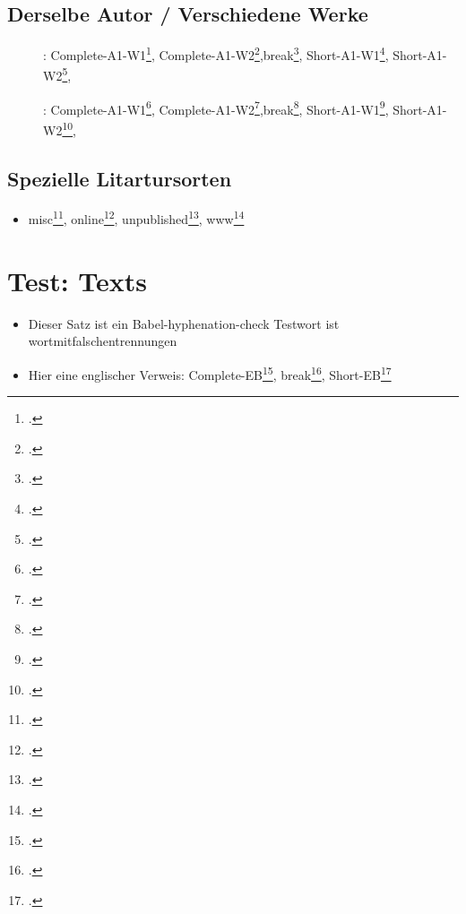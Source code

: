 \documentclass[
  DIV=calc,
  BCOR=5mm,
  11pt,
  headings=small,
  oneside,
  abstract=true,
  toc=bib,
  english,ngerman]{scrartcl}
\begin{document}
\subsection{Derselbe Autor / Verschiedene Werke}
\begin{description}
  \item[\mars]: Complete-A1-W1\footcite[vgl.][15]{S12020a}, Complete-A1-W2\footcite[vgl.][15]{S22020a},break\footcite[vgl.][15]{BR2020a}, Short-A1-W1\footcite[vgl.][15]{S12020a}, Short-A1-W2\footcite[vgl.][15]{S22020a},
  \item[\female\female]: Complete-A1-W1\footcite[vgl.][15]{S32020a}, Complete-A1-W2\footcite[vgl.][15]{S42020a},break\footcite[vgl.][15]{BR2020a}, Short-A1-W1\footcite[vgl.][15]{S32020a}, Short-A1-W2\footcite[vgl.][15]{S42020a},
\end{description}

\subsection{Spezielle Litartursorten}
\begin{itemize}
  \item misc\footcite[vgl.][15]{M12020a}, online\footcite[vgl.][15]{O12020a}, unpublished\footcite[vgl.][15]{UP12020a}, www\footcite[vgl.][15]{W12020a}
\end{itemize}


\section{Test: Texts}

\begin{itemize}
  \item Dieser Satz ist ein Babel-hyphenation-check Testwort ist wortmitfalschentrennungen
  \item Hier eine englischer Verweis: Complete-EB\footcite[vgl.][15]{L12020a}, break\footcite[vgl.][15]{BR2020a}, Short-EB\footcite[vgl.][15]{L12020a}
\end{itemize}



\printnomenclature
\printbibliography
\end{document}
